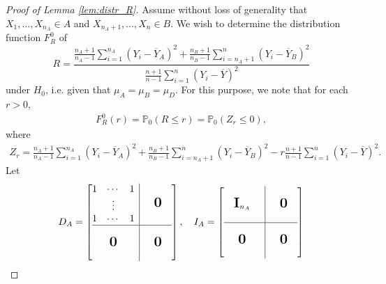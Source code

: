 \documentclass[11pt,a4paper]{article}
\renewcommand{\P}{\operatorname{P}}
\renewcommand{\P}{\mathbb{P}}  %
\newcommand{\bigzero}{\mbox{\normalfont\Large\bfseries 0}}
\newcommand{\bigone}{\mbox{\normalfont\Large\bfseries I}}
\begin{document}
\begin{proof}[Proof of Lemma \ref{lem:distr_R}]
	Assume without loss of generality that $X_1, \dots, X_{n_A} \in A$ and $X_{n_A + 1}, \dots, X_n \in B$. We wish to determine the distribution function $F_R^0$ of
	$$
		R = \frac{
			\frac{n_A + 1}{n_A - 1} \sum_{i=1}^{n_A} (Y_i - \overline Y_A)^2 + \frac{n_B + 1}{n_B - 1} \sum_{i= n_A + 1}^{n} (Y_i - \overline Y_B)^2
		}{
			\frac{n+1}{n -1} \sum_{i=1}^{n} (Y_i - \overline Y)^2
		}
	$$
	under $H_0$, i.e. given that $\mu_A = \mu_B = \mu_D$. For this purpose, we note that for each $r > 0$,
	\begin{align*}
		F_R^0(r) = \P_0(R \leq r) = \P_0(Z_r \leq 0),
	\end{align*}
	where
	\begin{align}\label{eq:Z_r}
		Z_r = \frac{n_A + 1}{n_A - 1} \sum_{i=1}^{n_A} (Y_i - \overline Y_A)^2 + \frac{n_B + 1}{n_B - 1} \sum_{i= n_A + 1}^{n} (Y_i - \overline Y_B)^2 - r
		\frac{n+1}{n -1} \sum_{i=1}^{n} (Y_i - \overline Y)^2.
	\end{align}
	Let
	\begin{align}
		D_A =\left[\begin{array}{@{}c|c@{}}
				           \begin{matrix}
					1 & \cdots & 1 \\
					  & \vdots     \\
					1 & \cdots & 1
				\end{matrix}
				                    & \quad \bigzero \quad \\
				           \hline                          \\
				           \bigzero &
				           \bigzero                        \\
				           \quad
			           \end{array}\right],
		\quad
		I_A =\left[\begin{array}{@{}c|c@{}}
				           \quad                           \\
				           \quad \bigone_{n_A} \quad
				                    & \quad \bigzero \quad \\
				           \quad                           \\
				           \hline                          \\
				           \bigzero &
				           \bigzero                        \\
				           \quad
			           \end{array}\right]
	\end{align}

\end{proof}
\end{document}
